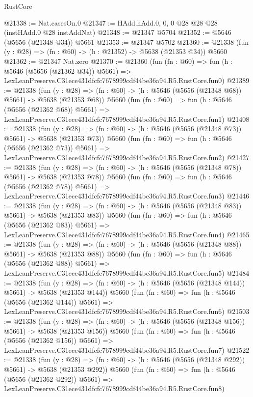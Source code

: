 \begin{lexlean}{RustCore}
\begin{coremodule}
@21338 := Nat.casesOn.{0}
@21347 := HAdd.hAdd.{0, 0, 0} @28 @28 @28 (instHAdd.{0} @28 instAddNat)
@21348 := @21347 @5704
@21352 := @5646 (@5656 (@21348 @34)) @5661
@21353 := @21347 @5702
@21360 := @21338 (fun (y : @28) => (fn : @60) -> (h : @21352) -> @5638 (@21353 @34)) @5660
@21362 := @21347 Nat.zero
@21370 := @21360
    (fun (fn : @60) =>
    fun (h : @5646 (@5656 (@21362 @34)) @5661) =>
    LexLeanPreserve.C31ece431dfcfc7678999cdf44be36a94.R5.RustCore.fun0)
@21389 := @21338
    (fun (y : @28) => (fn : @60) -> (h : @5646 (@5656 (@21348 @68)) @5661) -> @5638 (@21353 @68))
    @5660
    (fun (fn : @60) =>
    fun (h : @5646 (@5656 (@21362 @68)) @5661) =>
    LexLeanPreserve.C31ece431dfcfc7678999cdf44be36a94.R5.RustCore.fun1)
@21408 := @21338
    (fun (y : @28) => (fn : @60) -> (h : @5646 (@5656 (@21348 @73)) @5661) -> @5638 (@21353 @73))
    @5660
    (fun (fn : @60) =>
    fun (h : @5646 (@5656 (@21362 @73)) @5661) =>
    LexLeanPreserve.C31ece431dfcfc7678999cdf44be36a94.R5.RustCore.fun2)
@21427 := @21338
    (fun (y : @28) => (fn : @60) -> (h : @5646 (@5656 (@21348 @78)) @5661) -> @5638 (@21353 @78))
    @5660
    (fun (fn : @60) =>
    fun (h : @5646 (@5656 (@21362 @78)) @5661) =>
    LexLeanPreserve.C31ece431dfcfc7678999cdf44be36a94.R5.RustCore.fun3)
@21446 := @21338
    (fun (y : @28) => (fn : @60) -> (h : @5646 (@5656 (@21348 @83)) @5661) -> @5638 (@21353 @83))
    @5660
    (fun (fn : @60) =>
    fun (h : @5646 (@5656 (@21362 @83)) @5661) =>
    LexLeanPreserve.C31ece431dfcfc7678999cdf44be36a94.R5.RustCore.fun4)
@21465 := @21338
    (fun (y : @28) => (fn : @60) -> (h : @5646 (@5656 (@21348 @88)) @5661) -> @5638 (@21353 @88))
    @5660
    (fun (fn : @60) =>
    fun (h : @5646 (@5656 (@21362 @88)) @5661) =>
    LexLeanPreserve.C31ece431dfcfc7678999cdf44be36a94.R5.RustCore.fun5)
@21484 := @21338
    (fun (y : @28) => (fn : @60) -> (h : @5646 (@5656 (@21348 @144)) @5661) -> @5638 (@21353 @144))
    @5660
    (fun (fn : @60) =>
    fun (h : @5646 (@5656 (@21362 @144)) @5661) =>
    LexLeanPreserve.C31ece431dfcfc7678999cdf44be36a94.R5.RustCore.fun6)
@21503 := @21338
    (fun (y : @28) => (fn : @60) -> (h : @5646 (@5656 (@21348 @156)) @5661) -> @5638 (@21353 @156))
    @5660
    (fun (fn : @60) =>
    fun (h : @5646 (@5656 (@21362 @156)) @5661) =>
    LexLeanPreserve.C31ece431dfcfc7678999cdf44be36a94.R5.RustCore.fun7)
@21522 := @21338
    (fun (y : @28) => (fn : @60) -> (h : @5646 (@5656 (@21348 @292)) @5661) -> @5638 (@21353 @292))
    @5660
    (fun (fn : @60) =>
    fun (h : @5646 (@5656 (@21362 @292)) @5661) =>
    LexLeanPreserve.C31ece431dfcfc7678999cdf44be36a94.R5.RustCore.fun8)

\end{coremodule}
\end{lexlean}

